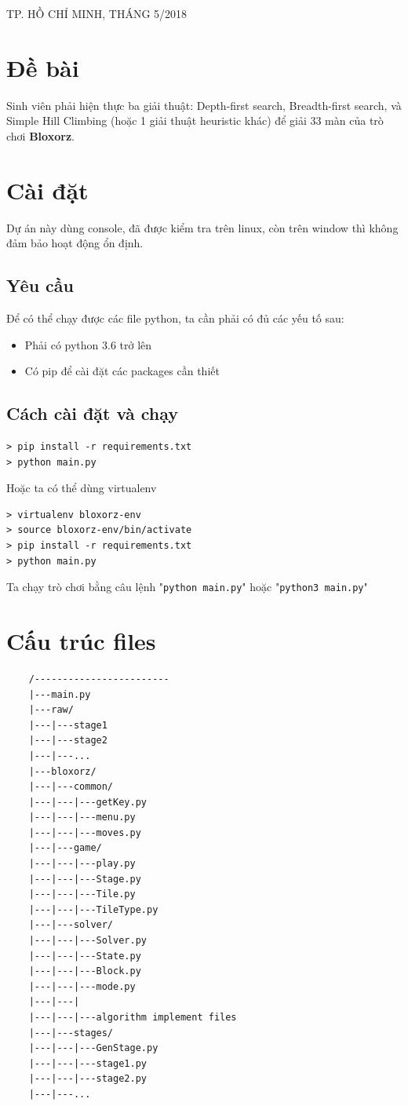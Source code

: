 \documentclass[a4paper, 11pt]{article}
\begin{document}
\begin{titlepage}
	\begin{center}
		{\footnotesize TP. HỒ CHÍ MINH, THÁNG 5/2018}
	\end{center}
\end{titlepage}



\newpage
\tableofcontents
\newpage
\section{Đề bài}
Sinh viên phải hiện thực ba giải thuật: Depth-first search, Breadth-first search,
và Simple Hill Climbing (hoặc 1 giải thuật heuristic khác) để giải 33 màn của trò chơi
\textbf{Bloxorz}.
\section{Cài đặt}
Dự án này dùng console, đã được kiểm tra trên linux, còn trên window thì không
đảm bảo hoạt động ổn định.
\subsection{Yêu cầu}
Để có thể chạy được các file python, ta cần phải có đủ các yếu tố sau:
\begin{itemize}
	\item Phải có python 3.6 trở lên
	\item Có pip để cài đặt các packages cần thiết
\end{itemize}
\subsection{Cách cài đặt và chạy}
\begin{verbatim}
> pip install -r requirements.txt
> python main.py
\end{verbatim}
Hoặc ta có thể dùng virtualenv
\begin{verbatim}
> virtualenv bloxorz-env
> source bloxorz-env/bin/activate
> pip install -r requirements.txt
> python main.py    
\end{verbatim}
Ta chạy trò chơi bằng câu lệnh "\texttt{python main.py}" hoặc "\texttt{python3 main.py}"
\newpage
\section{Cấu trúc files}
\begin{verbatim}
    /------------------------
    |---main.py
    |---raw/
    |---|---stage1
    |---|---stage2
    |---|---...
    |---bloxorz/
    |---|---common/
    |---|---|---getKey.py
    |---|---|---menu.py
    |---|---|---moves.py
    |---|---game/
    |---|---|---play.py
    |---|---|---Stage.py
    |---|---|---Tile.py
    |---|---|---TileType.py
    |---|---solver/
    |---|---|---Solver.py
    |---|---|---State.py
    |---|---|---Block.py
    |---|---|---mode.py
    |---|---|
    |---|---|---algorithm implement files
    |---|---stages/
    |---|---|---GenStage.py
    |---|---|---stage1.py
    |---|---|---stage2.py
    |---|---...
\end{verbatim}
\end{document}

